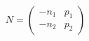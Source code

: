 \begin{equation}
N= \left(
\begin{array}{cc}
-n_1 & p_1 \\
-n_2 & p_2 
\end{array}  \right)
\end{equation}

